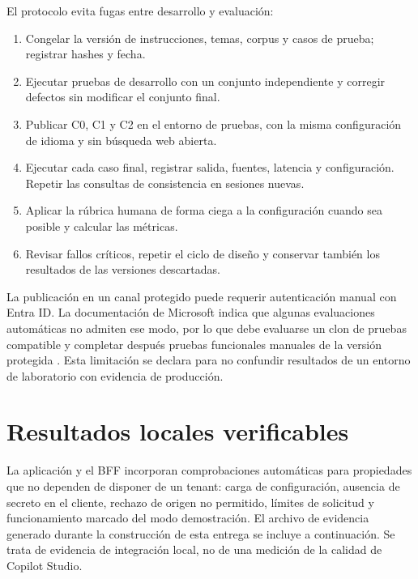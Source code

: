 El protocolo evita fugas entre desarrollo y evaluaci\'on:

\begin{enumerate}[label=\arabic*.]
  \item Congelar la versi\'on de instrucciones, temas, corpus y casos de prueba; registrar hashes y fecha.
  \item Ejecutar pruebas de desarrollo con un conjunto independiente y corregir defectos sin modificar el conjunto final.
  \item Publicar C0, C1 y C2 en el entorno de pruebas, con la misma configuraci\'on de idioma y sin b\'usqueda web abierta.
  \item Ejecutar cada caso final, registrar salida, fuentes, latencia y configuraci\'on. Repetir las consultas de consistencia en sesiones nuevas.
  \item Aplicar la r\'ubrica humana de forma ciega a la configuraci\'on cuando sea posible y calcular las m\'etricas.
  \item Revisar fallos cr\'iticos, repetir el ciclo de dise\~no y conservar tambi\'en los resultados de las versiones descartadas.
\end{enumerate}

La publicaci\'on en un canal protegido puede requerir autenticaci\'on manual con Entra ID. La documentaci\'on de Microsoft indica que algunas evaluaciones autom\'aticas no admiten ese modo, por lo que debe evaluarse un clon de pruebas compatible y completar despu\'es pruebas funcionales manuales de la versi\'on protegida \cite{copilotEvaluation,copilotSso}. Esta limitaci\'on se declara para no confundir resultados de un entorno de laboratorio con evidencia de producci\'on.

\section{Resultados locales verificables}

La aplicaci\'on y el BFF incorporan comprobaciones autom\'aticas para propiedades que no dependen de disponer de un tenant: carga de configuraci\'on, ausencia de secreto en el cliente, rechazo de origen no permitido, l\'imites de solicitud y funcionamiento marcado del modo demostraci\'on. El archivo de evidencia generado durante la construcci\'on de esta entrega se incluye a continuaci\'on. Se trata de evidencia de integraci\'on local, no de una medici\'on de la calidad de Copilot Studio.



